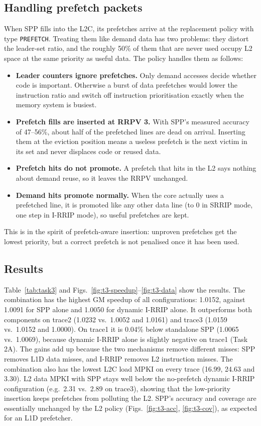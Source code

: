 \documentclass[conference]{IEEEtran}
\begin{document}
\subsection{Handling prefetch packets}
When SPP fills into the L2C, its prefetches arrive at the replacement policy
with type \texttt{PREFETCH}. Treating them like demand data has two problems:
they distort the leader-set ratio, and the roughly 50\% of them that are never
used occupy L2 space at the same priority as useful data. The policy handles them
as follows:
\begin{itemize}
\item \textbf{Leader counters ignore prefetches.} Only demand accesses decide
whether code is important. Otherwise a burst of data prefetches would lower the
instruction ratio and switch off instruction prioritisation exactly when the
memory system is busiest.
\item \textbf{Prefetch fills are inserted at RRPV 3.} With SPP's measured
accuracy of 47--56\%, about half of the prefetched lines are dead on arrival.
Inserting them at the eviction position means a useless prefetch is the next
victim in its set and never displaces code or reused data.
\item \textbf{Prefetch hits do not promote.} A prefetch that hits in the L2 says
nothing about demand reuse, so it leaves the RRPV unchanged.
\item \textbf{Demand hits promote normally.} When the core actually uses a
prefetched line, it is promoted like any other data line (to 0 in SRRIP mode, one
step in I-RRIP mode), so useful prefetches are kept.
\end{itemize}
This is in the spirit of prefetch-aware insertion: unproven prefetches get the
lowest priority, but a correct prefetch is not penalised once it has been used.

\subsection{Results}
Table~\ref{tab:task3} and Figs.~\ref{fig:t3-speedup}--\ref{fig:t3-data} show
the results. The combination has the highest GM speedup of all
configurations: 1.0152, against 1.0091 for SPP alone and 1.0050 for dynamic
I-RRIP alone. It outperforms both components on trace2 (1.0232 vs.\ 1.0052 and
1.0161) and trace3 (1.0159 vs.\ 1.0152 and 1.0000). On trace1 it is 0.04\%
below standalone SPP (1.0065 vs.\ 1.0069), because dynamic I-RRIP alone is
slightly negative on trace1 (Task 2A). The gains add up because the two
mechanisms remove different misses: SPP removes L1D data misses, and I-RRIP
removes L2 instruction misses. The combination also has the lowest L2C load
MPKI on every trace (16.99, 24.63 and 3.30). L2 data MPKI with SPP stays well
below the no-prefetch dynamic I-RRIP configuration (e.g.\ 2.31 vs.\ 2.89 on
trace3), showing that the low-priority insertion keeps prefetches from
polluting the L2. SPP's accuracy and coverage are essentially unchanged by the
L2 policy (Figs.~\ref{fig:t3-acc}, \ref{fig:t3-cov}), as expected for an L1D
prefetcher.
\end{document}
